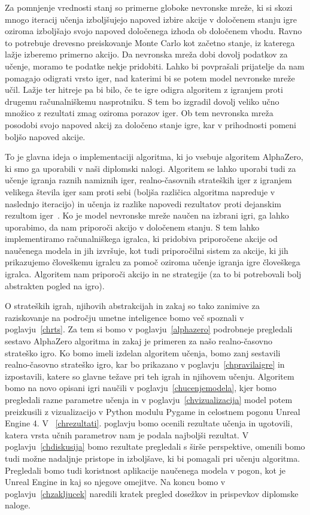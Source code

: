 \documentclass[a4paper, 12pt]{book}
\begin{document}
Za pomnjenje vrednosti stanj so primerne globoke nevronske mreže, ki si skozi mnogo iteracij učenja izboljšujejo napoved izbire akcije v določenem stanju igre oziroma izboljšajo svojo napoved določenega izhoda ob določenem vhodu.
Ravno to potrebuje drevesno preiskovanje Monte Carlo kot začetno stanje, iz katerega lažje izberemo primerno akcijo.
Da nevronska mreža dobi dovolj podatkov za učenje, moramo te podatke nekje pridobiti.
Lahko bi povprašali prijatelje da nam pomagajo odigrati vrsto iger, nad katerimi bi se potem model nevronske mreže učil.
Lažje ter hitreje pa bi bilo, če te igre odigra algoritem z igranjem proti drugemu računalniškemu nasprotniku.
S tem bo izgradil dovolj veliko učno množico z rezultati zmag oziroma porazov iger. 
Ob tem nevronska mreža posodobi svojo napoved akcij za določeno stanje igre, kar v prihodnosti pomeni boljšo napoved akcije.

To je glavna ideja o implementaciji algoritma, ki jo vsebuje algoritem AlphaZero, ki smo ga uporabili v naši diplomski nalogi.
Algoritem se lahko uporabi tudi za učenje igranja raznih namiznih iger, realno-časovnih strateških iger z igranjem velikega števila iger sam proti sebi (boljša različica algoritma napreduje v naslednjo iteracijo) in učenja iz razlike napovedi rezultatov proti dejanskim rezultom iger~{\cite{silver2018general}}.
Ko je model nevronske mreže naučen na izbrani igri, ga lahko uporabimo, da nam priporoči akcijo v določenem stanju.
S tem lahko implementiramo računalniškega igralca, ki pridobiva priporočene akcije od naučenega modela in jih izvršuje, kot tudi priporočilni sistem za akcije, ki jih prikazujemo človeškemu igralcu za pomoč oziroma učenje igranja igre človeškega igralca. 
Algoritem nam priporoči akcijo in ne strategije (za to bi potrebovali bolj abstrakten pogled na igro). 

O strateških igrah, njihovih abstrakcijah in zakaj so tako zanimive za raziskovanje na področju umetne inteligence bomo več spoznali v poglavju~\ref{chrts}.
Za tem si bomo v poglavju~\ref{alphazero} podrobneje pregledali sestavo AlphaZero algoritma in zakaj je primeren za našo realno-časovno strateško igro.
Ko bomo imeli izdelan algoritem učenja, bomo zanj sestavili realno-časovno strateško igro, kar bo prikazano v poglavju~\ref{chpravilaigre} in izpostavili, katere so glavne težave pri teh igrah in njihovem učenju.
Algoritem bomo na novo opisani igri naučili v poglavju~\ref{chucenjemodela}, kjer bomo pregledali razne parametre učenja in v poglavju~\ref{chvizualizacija} model potem preizkusili z vizualizacijo v Python modulu Pygame in celostnem pogonu Unreal Engine 4.
V ~\ref{chrezultati}. poglavju bomo ocenili rezultate učenja in ugotovili, katera vrsta učnih parametrov nam je podala najboljši rezultat.
V poglavju~\ref{chdiskusija} bomo rezultate pregledali s širše perspektive, omenili bomo tudi možne nadaljnje pristope in izboljšave, ki bi pomagali pri učenju algoritma. 
Pregledali bomo tudi koristnost aplikacije naučenega modela v pogon, kot je Unreal Engine in kaj so njegove omejitve.
Na koncu bomo v poglavju~\ref{chzakljucek} naredili kratek pregled dosežkov in prispevkov diplomske naloge.
\end{document}
